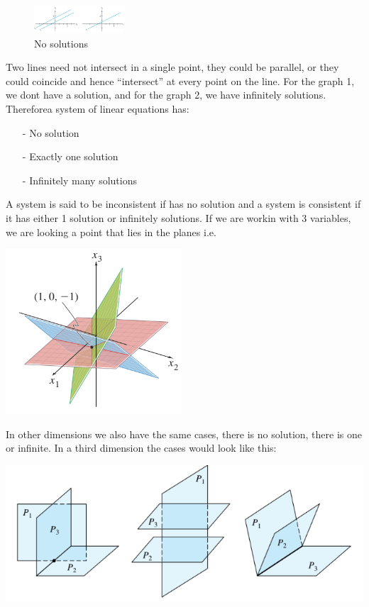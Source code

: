\documentclass{article}
\begin{document}
\begin{figure} 
    \centering
    \includegraphics[width=0.3\textwidth]{image1.png}
    \caption{No solutions}
\end{figure}

Two lines need not intersect in a single point, they could be parallel, or they could coincide and hence “intersect” at every point on the line. For the graph 1, we dont have a solution, and for the graph 2, we have infinitely solutions. Thereforea system of linear equations has:

\begin{itemize}
    \item[-] No solution 
    \item[-] Exactly one solution
    \item[-] Infinitely many solutions \newline
\end{itemize} 

\noindent A system is said to be inconsistent if has no solution and a system is consistent if it has either 1 solution or infinitely solutions. If we are workin with 3 variables, we are looking a point that lies in the planes i.e.

\includegraphics{image2.png}

In other dimensions we also have the same cases, there is no solution, there is one or infinite. In a third dimension the cases would look like this: 

\includegraphics{image4.png}
\end{document}
